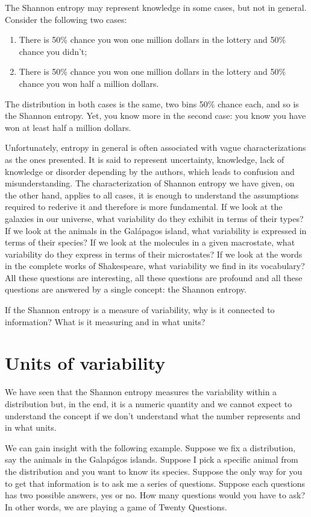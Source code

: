 \documentclass{article}
\begin{document}
The Shannon entropy may represent knowledge in some cases, but not in general. Consider the following two cases:
\begin{enumerate}
    \item There is 50\% chance you won one million dollars in the lottery and 50\% chance you didn't;
    \item There is 50\% chance you won one million dollars in the lottery and 50\% chance you won half a million dollars.
\end{enumerate}
The distribution in both cases is the same, two bins 50\% chance each, and so is the Shannon entropy. Yet, you know more in the second case: you know you have won at least half a million dollars.

Unfortunately, entropy in general is often associated with vague characterizations as the ones presented. It is said to represent uncertainty, knowledge, lack of knowledge or disorder depending by the authors, which leads to confusion and misunderstanding.  The characterization of Shannon entropy we have given, on the other hand, applies to all cases, it is enough to understand the assumptions required to rederive it and therefore is more fundamental. If we look at the galaxies in our universe, what variability do they exhibit in terms of their types? If we look at the animals in the Gal\'{a}pagos island, what variability is expressed in terms of their species? If we look at the molecules in a given macrostate, what variability do they express in terms of their microstates? If we look at the words in the complete works of Shakespeare, what variability we find in its vocabulary? All these questions are interesting, all these questions are profound and all these questions are answered by a single concept: the Shannon entropy.

If the Shannon entropy is a measure of variability, why is it connected to information? What is it measuring and in what units?

\section{Units of variability}

We have seen that the Shannon entropy measures the variability within a distribution but, in the end, it is a numeric quantity and we cannot expect to understand the concept if we don't understand what the number represents and in what units.

We can gain insight with the following example. Suppose we fix a distribution, say the animals in the Galap\'{a}gos islands. Suppose I pick a specific animal from the distribution and you want to know its species. Suppose the only way for you to get that information is to ask me a series of questions. Suppose each questions has two possible answers, yes or no. How many questions would you have to ask? In other words, we are playing a game of Twenty Questions.
\end{document}
